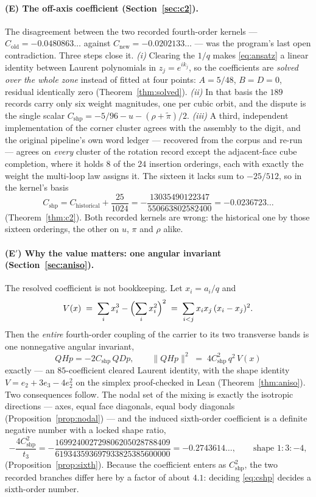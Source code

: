 \documentclass[11pt]{article}
\theoremstyle{definition}
\theoremstyle{remark}
\begin{document}
\paragraph{(E) The off-axis coefficient (Section~\ref{sec:c2}).}
The disagreement between the two recorded fourth-order kernels ---
$C_{\mathrm{old}}=-0.0480863\ldots$ against $C_{\mathrm{new}}=-0.0202133\ldots$
--- was the program's last open contradiction. Three steps close it.
\emph{(i)} Clearing the $1/q$ makes \eqref{eq:ansatz} a linear identity between
Laurent polynomials in $z_j=e^{ik_j}$, so the coefficients are \emph{solved
over the whole zone} instead of fitted at four points: $A=5/48$, $B=D=0$,
residual identically zero (Theorem~\ref{thm:solved}). \emph{(ii)} In that basis
the $189$ records carry only six weight magnitudes, one per cubic orbit, and
the dispute is the single scalar
$C_{\mathrm{shp}}=-5/96-u-(\rho+\tilde\pi)/2$. \emph{(iii)} A third,
independent implementation of the corner cluster agrees with the assembly to
the digit, and the original pipeline's own word ledger --- recovered from the
corpus and re-run --- agrees on \emph{every} cluster of the rotation record
except the adjacent-face cube completion, where it holds $8$ of the $24$
insertion orderings, each with exactly the weight the multi-loop law assigns
it. The sixteen it lacks sum to $-25/512$, so in the kernel's basis
\begin{equation}\label{eq:cshp}
  C_{\mathrm{shp}}=C_{\mathrm{historical}}+\frac{25}{1024}
  =-\frac{13035490122347}{550663802582400}=-0.0236723\ldots
\end{equation}
(Theorem~\ref{thm:c2}). Both recorded kernels are wrong: the historical one by
those sixteen orderings, the other on $u$, $\pi$ and $\rho$ alike.

\paragraph{(E$'$) Why the value matters: one angular invariant
(Section~\ref{sec:aniso}).}
The resolved coefficient is not bookkeeping. Let $x_i=a_i/q$ and
\[
  V(x)\;=\;\sum_i x_i^3-\Bigl(\sum_i x_i^2\Bigr)^{2}
        \;=\;\sum_{i<j}x_ix_j\,(x_i-x_j)^2 .
\]
Then the \emph{entire} fourth-order coupling of the carrier to its two
transverse bands is one nonnegative angular invariant,
\[
  Q H p=-2C_{\mathrm{shp}}\,QDp ,\qquad
  \bigl\|QHp\bigr\|^2 \;=\; 4C_{\mathrm{shp}}^2\,q^2\,V(x)
\]
exactly --- an $85$-coefficient cleared Laurent identity, with the shape
identity $V=e_2+3e_3-4e_2^2$ on the simplex proof-checked in Lean
(Theorem~\ref{thm:aniso}). Two consequences follow. The nodal set of the
mixing is exactly the isotropic directions --- axes, equal face diagonals,
equal body diagonals (Proposition~\ref{prop:nodal}) --- and the induced
sixth-order coefficient is a definite negative number with a locked shape
ratio,
\[
  -\frac{4C_{\mathrm{shp}}^2}{t_3}
  =-\frac{169924002729806205028788409}{619343593697933825385600000}
  =-0.2743614\ldots,\qquad \text{shape } 1:3:-4 ,
\]
(Proposition~\ref{prop:sixth}). Because the coefficient enters as
$C_{\mathrm{shp}}^2$, the two recorded branches differ here by a factor of
about $4.1$: deciding \eqref{eq:cshp} decides a sixth-order number.
\end{document}
